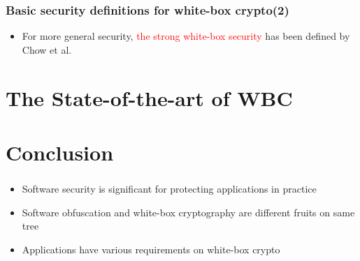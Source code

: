 \documentclass{beamer}
\begin{document}
\frame
{
\frametitle{Basic security definitions for white-box crypto(2)}
\begin{itemize}
\item For more general security, \textcolor{red}{the strong white-box security} has been defined by Chow et al.
\end{itemize}

\begin{center}
\end{center}
}

\section{The State-of-the-art of WBC}

\section{Conclusion}

\frame
{
\frametitle{}

\begin{itemize}
\setlength{\itemsep}{12pt}
\item Software security is significant for protecting applications in practice

\item Software obfuscation and white-box cryptography are different fruits on same tree

\item Applications have various requirements on white-box crypto

\end{itemize}

}
\end{document}
